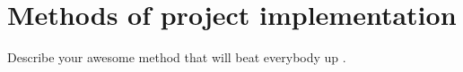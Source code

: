 \section{Methods of project implementation}
Describe your awesome method that will beat everybody up \cite{skrhak2023bibm}.